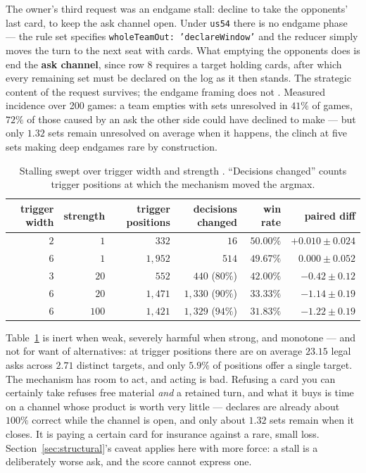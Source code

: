 \documentclass[11pt]{article}
\newcommand{\code}[1]{\texttt{#1}}
\newcommand{\usff}{\code{us54}}
\begin{document}
The owner's third request was an endgame stall: decline to take the opponents' last card, to keep
the ask channel open. Under \usff{} there is no endgame phase --- the rule set specifies
\code{wholeTeamOut: 'declareWindow'} and the reducer simply moves the turn to the next seat with
cards. What emptying the opponents does is end the \textbf{ask channel}, since row 8 requires a
target holding cards, after which every remaining set must be declared on the log as it then stands.
The strategic content of the request survives; the endgame framing does not \cite{concession,rules}.
Measured incidence over 200 games: a team empties with sets unresolved in $41\%$ of games, $72\%$ of
those caused by an ask the other side could have declined to make --- but only $\mathbf{1.32}$ sets
remain unresolved on average when it happens, the clinch at five sets making deep endgames rare by
construction.

\begin{table}[t]
\centering
\caption{Stalling swept over trigger width and strength \cite{concession}. ``Decisions
changed'' counts trigger positions at which the mechanism moved the argmax.}
\label{tab:stall}
\footnotesize
\begin{tabular}{@{}rrrrrr@{}}
\toprule
trigger width & strength & trigger positions & decisions changed & win rate & paired diff \\
\midrule
$2$ & $1$   & $332$     & $16$              & $50.00\%$ & $+0.010 \pm 0.024$ \\
$6$ & $1$   & $1{,}952$ & $514$             & $49.67\%$ & $0.000 \pm 0.052$ \\
$3$ & $20$  & $552$     & $440$ ($80\%$)    & $42.00\%$ & $\mathbf{-0.42 \pm 0.12}$ \\
$6$ & $20$  & $1{,}471$ & $1{,}330$ ($90\%$) & $\mathbf{33.33\%}$ & $\mathbf{-1.14 \pm 0.19}$ \\
$6$ & $100$ & $1{,}421$ & $1{,}329$ ($94\%$) & $31.83\%$ & $-1.22 \pm 0.19$ \\
\bottomrule
\end{tabular}
\end{table}

Table~\ref{tab:stall} is inert when weak, severely harmful when strong, and monotone --- and not for
want of alternatives: at trigger positions there are on average $23.15$ legal asks across $2.71$
distinct targets, and only $5.9\%$ of positions offer a single target. The mechanism has room to
act, and acting is bad. Refusing a card you can certainly take refuses free material \emph{and} a
retained turn, and what it buys is time on a channel whose product is worth very little --- declares
are already about $100\%$ correct while the channel is open, and only about $1.32$ sets remain when
it closes. It is paying a certain card for insurance against a rare, small loss.
Section~\ref{sec:structural}'s caveat applies here with more force: a stall is a deliberately worse
ask, and the score cannot express one.
\end{document}
